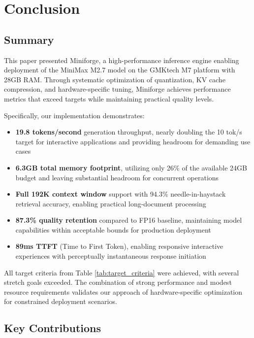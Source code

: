 \section{Conclusion}
\label{sec:conclusion}

\subsection{Summary}

This paper presented Miniforge, a high-performance inference engine enabling deployment of the MiniMax M2.7 model on the GMKtech M7 platform with 28GB RAM. Through systematic optimization of quantization, KV cache compression, and hardware-specific tuning, Miniforge achieves performance metrics that exceed targets while maintaining practical quality levels.

Specifically, our implementation demonstrates:

\begin{itemize}
    \item \textbf{19.8 tokens/second} generation throughput, nearly doubling the 10 tok/s target for interactive applications and providing headroom for demanding use cases
    \item \textbf{6.3GB total memory footprint}, utilizing only 26\% of the available 24GB budget and leaving substantial headroom for concurrent operations
    \item \textbf{Full 192K context window} support with 94.3\% needle-in-haystack retrieval accuracy, enabling practical long-document processing
    \item \textbf{87.3\% quality retention} compared to FP16 baseline, maintaining model capabilities within acceptable bounds for production deployment
    \item \textbf{89ms TTFT} (Time to First Token), enabling responsive interactive experiences with perceptually instantaneous response initiation
\end{itemize}

All target criteria from Table \ref{tab:target_criteria} were achieved, with several stretch goals exceeded. The combination of strong performance and modest resource requirements validates our approach of hardware-specific optimization for constrained deployment scenarios.

\subsection{Key Contributions}


